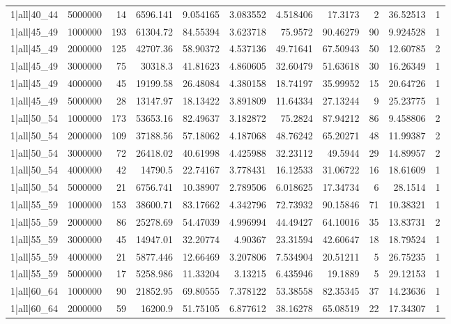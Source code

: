\begin{tabular}{lrrrrrrrrrr}
1|all|40\_44 & 5000000 & 14 & 6596.141 & 9.054165 & 3.083552 & 4.518406 & 17.3173 & 2 & 36.52513 & 1 \\
1|all|45\_49 & 1000000 & 193 & 61304.72 & 84.55394 & 3.623718 & 75.9572 & 90.46279 & 90 & 9.924528 & 1 \\
1|all|45\_49 & 2000000 & 125 & 42707.36 & 58.90372 & 4.537136 & 49.71641 & 67.50943 & 50 & 12.60785 & 2 \\
1|all|45\_49 & 3000000 & 75 & 30318.3 & 41.81623 & 4.860605 & 32.60479 & 51.63618 & 30 & 16.26349 & 1 \\
1|all|45\_49 & 4000000 & 45 & 19199.58 & 26.48084 & 4.380158 & 18.74197 & 35.99952 & 15 & 20.64726 & 1 \\
1|all|45\_49 & 5000000 & 28 & 13147.97 & 18.13422 & 3.891809 & 11.64334 & 27.13244 & 9 & 25.23775 & 1 \\
1|all|50\_54 & 1000000 & 173 & 53653.16 & 82.49637 & 3.182872 & 75.2824 & 87.94212 & 86 & 9.458806 & 2 \\
1|all|50\_54 & 2000000 & 109 & 37188.56 & 57.18062 & 4.187068 & 48.76242 & 65.20271 & 48 & 11.99387 & 2 \\
1|all|50\_54 & 3000000 & 72 & 26418.02 & 40.61998 & 4.425988 & 32.23112 & 49.5944 & 29 & 14.89957 & 2 \\
1|all|50\_54 & 4000000 & 42 & 14790.5 & 22.74167 & 3.778431 & 16.12533 & 31.06722 & 16 & 18.61609 & 1 \\
1|all|50\_54 & 5000000 & 21 & 6756.741 & 10.38907 & 2.789506 & 6.018625 & 17.34734 & 6 & 28.1514 & 1 \\
1|all|55\_59 & 1000000 & 153 & 38600.71 & 83.17662 & 4.342796 & 72.73932 & 90.15846 & 71 & 10.38321 & 1 \\
1|all|55\_59 & 2000000 & 86 & 25278.69 & 54.47039 & 4.996994 & 44.49427 & 64.10016 & 35 & 13.83731 & 2 \\
1|all|55\_59 & 3000000 & 45 & 14947.01 & 32.20774 & 4.90367 & 23.31594 & 42.60647 & 18 & 18.79524 & 1 \\
1|all|55\_59 & 4000000 & 21 & 5877.446 & 12.66469 & 3.207806 & 7.534904 & 20.51211 & 5 & 26.75235 & 1 \\
1|all|55\_59 & 5000000 & 17 & 5258.986 & 11.33204 & 3.13215 & 6.435946 & 19.1889 & 5 & 29.12153 & 1 \\
1|all|60\_64 & 1000000 & 90 & 21852.95 & 69.80555 & 7.378122 & 53.38558 & 82.35345 & 37 & 14.23636 & 1 \\
1|all|60\_64 & 2000000 & 59 & 16200.9 & 51.75105 & 6.877612 & 38.16278 & 65.08519 & 22 & 17.34307 & 1 \\

\end{tabular}
